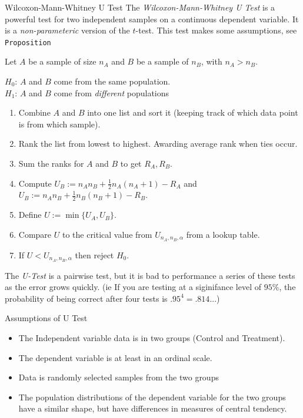 \documentclass[11pt,a4paper]{article}
\begin{document}
  \begin{definition}{Wilcoxon-Mann-Whitney U Test}
    The \textit{Wilcoxon-Mann-Whitney U Test} is a powerful test for two independent samples on a continuous dependent variable. It is a \textit{non-parameteric} version of the $t$-test. This test makes some assumptions, see \texttt{Proposition }
    \par Let $A$ be a sample of size $n_A$ and $B$ be a sample of $n_B$, with $n_A>n_B$.
    \begin{center}$H_0$: $A$ and $B$ come from the same population.\\$H_1$: $A$ and $B$ come from \textit{different} populations\end{center}
    \begin{enumerate}
      \item Combine $A$ and $B$ into one list and sort it (keeping track of which data point is from which sample).
      \item Rank the list from lowest to highest. Awarding average rank when ties occur.
      \item Sum the ranks for $A$ and $B$ to get $R_A,R_B$.
      \item Compute $U_B:=n_An_B+\frac12n_A(n_A+1)-R_A$ and $U_B:=n_An_B+\frac12n_B(n_B+1)-R_B$.
      \item Define $U:=\min\{U_A,U_B\}$.
      \item Compare $U$ to the critical value from $U_{n_A,n_B,\alpha}$ from a lookup table.
      \item If $U<U_{n_A,n_B,\alpha}$ then reject $H_0$.
    \end{enumerate}
    The \textit{U-Test} is a pairwise test, but it is bad to performance a series of these tests as the error grows quickly. (ie If you are testing at a siginifance level of $95\%$, the probability of being correct after four tests is $.95^4=.814...$)
  \end{definition}

  \begin{proposition}{Assumptions of U Test}
    \begin{itemize}
      \item The Independent variable data is in two groups (Control and Treatment).
      \item The dependent variable is at least in an ordinal scale.
      \item Data is randomly selected samples from the two groups
      \item The population distributions of the dependent variable for the two groups have a similar shape, but have differences in measures of central tendency.
    \end{itemize}
  \end{proposition}
\end{document}
